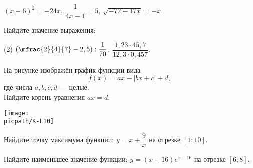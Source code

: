 \begin{consultation}
\begin{listofex}
\begin{tasks}
			\task \( (x-6)^2=-24x \),
			\task \( \dfrac{1}{4x-1}=5 \),
			\task \( \sqrt{-72-17x}=-x \).
		\end{tasks}
		\item Найдите значение выражения:
		\begin{tasks}(2)
			\task \( \left( \mfrac{2}{4}{7} - 2,5 \right) : \dfrac{1}{70} \),
			\task \( \dfrac{1,23 \cdot 45,7}{12,3 \cdot 0,457} \).
		\end{tasks}
		\item
		\begin{minipage}[t]{\bodywidth}
			На рисунке изображён график функции вида \[ f(x)=ax-|bx+c|+d, \] где числа \(a, b, c, d\) --- целые.\\ Найдите корень уравнения \(ax=d\).
		\end{minipage}
		\hspace{0.02\linewidth}
		\begin{minipage}[t]{\picwidth}
			\texttt{[image: \\picpath/K-L10]}
		\end{minipage}
		\item Найдите точку максимума функции: \( y=x+\dfrac{9}{x} \) на отрезке \( [1;10] \).
		\item Найдите наименьшее значение функции: \( y = (x+16)e^{x-16} \) на отрезке \( [6;8] \).
	\end{listofex}
\end{consultation}
